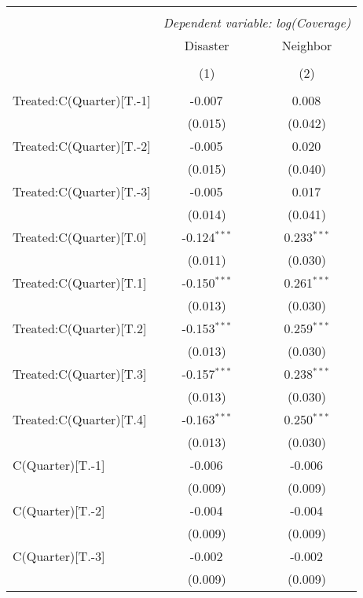 
\begin{tabular}{@{\extracolsep{5pt}}lcc}
\\[-1.8ex]\hline
\hline \\[-1.8ex]
& \multicolumn{2}{c}{\textit{Dependent variable: log(Coverage)}} \
\cr \cline{2-3}
\\[-1.8ex] & \multicolumn{1}{c}{Disaster} & \multicolumn{1}{c}{Neighbor}  \\
\\[-1.8ex] & (1) & (2) \\
\hline \\[-1.8ex]
 Treated:C(Quarter)[T.-1] & -0.007$^{}$ & 0.008$^{}$ \\
& (0.015) & (0.042) \\
 Treated:C(Quarter)[T.-2] & -0.005$^{}$ & 0.020$^{}$ \\
& (0.015) & (0.040) \\
 Treated:C(Quarter)[T.-3] & -0.005$^{}$ & 0.017$^{}$ \\
& (0.014) & (0.041) \\
 Treated:C(Quarter)[T.0] & -0.124$^{***}$ & 0.233$^{***}$ \\
& (0.011) & (0.030) \\
 Treated:C(Quarter)[T.1] & -0.150$^{***}$ & 0.261$^{***}$ \\
& (0.013) & (0.030) \\
 Treated:C(Quarter)[T.2] & -0.153$^{***}$ & 0.259$^{***}$ \\
& (0.013) & (0.030) \\
 Treated:C(Quarter)[T.3] & -0.157$^{***}$ & 0.238$^{***}$ \\
& (0.013) & (0.030) \\
 Treated:C(Quarter)[T.4] & -0.163$^{***}$ & 0.250$^{***}$ \\
& (0.013) & (0.030) \\
C(Quarter)[T.-1] & -0.006$^{}$ & -0.006$^{}$ \\
& (0.009) & (0.009) \\
 C(Quarter)[T.-2] & -0.004$^{}$ & -0.004$^{}$ \\
& (0.009) & (0.009) \\
 C(Quarter)[T.-3] & -0.002$^{}$ & -0.002$^{}$ \\
& (0.009) & (0.009) \\

\end{tabular}
